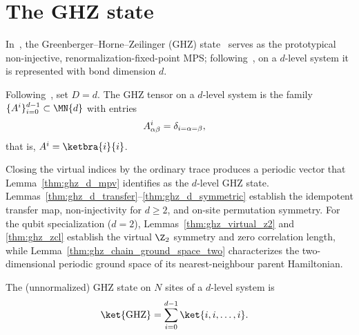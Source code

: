 \section{The GHZ state}\label{sec:ghz}

In~\cite[Section~III.A]{Cirac2021Matrix}, the Greenberger--Horne--Zeilinger
(GHZ) state~\cite{GreenbergerHorneZeilinger1989,Greenberger1990Bell} serves as
the prototypical non-injective, renormalization-fixed-point MPS;
following~\cite[Appendix~A, ``The GHZ state'']{Cirac2021Matrix}, on a $d$-level
system it is represented with bond dimension $d$.

\begin{definition}\label{def:ghz_tensor_d}
    \leanok
    Following~\cite[Appendix~A, ``The GHZ
        state'']{Cirac2021Matrix}, set $D = d$. The GHZ tensor on a $d$-level
    system is the family
    $\{A^i\}_{i=0}^{d-1}\subset\MN{d}$ with entries
    \begin{align}
        A^{i}_{\alpha\beta} & = \delta_{i=\alpha=\beta},
        \notag
    \end{align}
    that is, $A^i=\ketbra{i}{i}$.
\end{definition}

Closing the virtual indices by the ordinary trace produces a periodic
vector that Lemma~\ref{thm:ghz_d_mpv} identifies as the $d$-level GHZ
state. Lemmas~\ref{thm:ghz_d_transfer}--\ref{thm:ghz_d_symmetric}
establish the idempotent transfer map, non-injectivity for $d\ge2$, and
on-site permutation symmetry. For the qubit specialization ($d=2$),
Lemmas~\ref{thm:ghz_virtual_z2} and \ref{thm:ghz_zcl} establish the
virtual $\Z_2$ symmetry and zero correlation length, while
Lemma~\ref{thm:ghz_chain_ground_space_two} characterizes the
two-dimensional periodic ground space of its nearest-neighbour parent
Hamiltonian.


\begin{definition}\label{def:ghz_state_d}
    \leanok
    The (unnormalized) GHZ state on $N$ sites of a $d$-level system is
    \begin{align}
        \ket{\mathrm{GHZ}} & = \sum_{i=0}^{d-1}\ket{i,i,\ldots,i}.
        \notag
    \end{align}
\end{definition}

